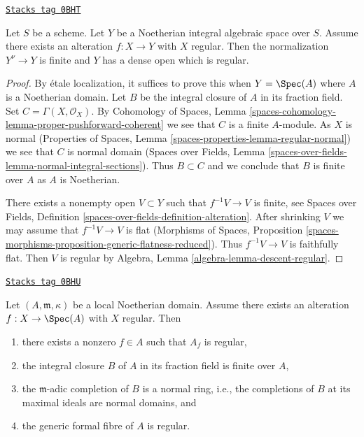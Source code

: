 \begin{lemma}
\label{spaces-resolve-lemma-regular-alteration-implies}
\href{https://stacks.math.columbia.edu/tag/0BHT}{\texttt{Stacks tag 0BHT}}

Let $S$ be a scheme. Let $Y$ be a Noetherian integral algebraic space
over $S$. Assume there exists an alteration
$f : X \to Y$ with $X$ regular. Then the normalization $Y^\nu \to Y$
is finite and $Y$ has a dense open which is regular.
\end{lemma}

\begin{proof}
By \'etale localization, it suffices to prove this when
$Y = \Spec(A)$ where $A$ is a Noetherian domain.
Let $B$ be the integral closure of $A$ in its fraction field.
Set $C = \Gamma(X, \mathcal{O}_X)$. By
Cohomology of Spaces, Lemma
\ref{spaces-cohomology-lemma-proper-pushforward-coherent}
we see that $C$ is a finite $A$-module.
As $X$ is normal
(Properties of Spaces, Lemma
\ref{spaces-properties-lemma-regular-normal})
we see that $C$ is normal domain
(Spaces over Fields, Lemma
\ref{spaces-over-fields-lemma-normal-integral-sections}).
Thus $B \subset C$ and we conclude that $B$ is finite over $A$
as $A$ is Noetherian.

\medskip\noindent
There exists a nonempty open $V \subset Y$ such that $f^{-1}V \to V$
is finite, see Spaces over Fields, Definition
\ref{spaces-over-fields-definition-alteration}.
After shrinking $V$ we may assume that $f^{-1}V \to V$ is flat
(Morphisms of Spaces, Proposition
\ref{spaces-morphisms-proposition-generic-flatness-reduced}).
Thus $f^{-1}V \to V$ is faithfully flat. Then $V$ is regular by
Algebra, Lemma \ref{algebra-lemma-descent-regular}.
\end{proof}

\begin{lemma}
\label{spaces-resolve-lemma-regular-alteration-implies-local}
\href{https://stacks.math.columbia.edu/tag/0BHU}{\texttt{Stacks tag 0BHU}}

Let $(A, \mathfrak m, \kappa)$ be a local Noetherian domain.
Assume there exists an alteration $f : X \to \Spec(A)$
with $X$ regular. Then
\begin{enumerate}
\item there exists a nonzero $f \in A$ such that $A_f$ is regular,
\item the integral closure $B$ of $A$ in its fraction field is finite over $A$,
\item the $\mathfrak m$-adic completion of $B$ is a normal ring, i.e., the
completions of $B$ at its maximal ideals are normal domains, and
\item the generic formal fibre of $A$ is regular.
\end{enumerate}
\end{lemma}

